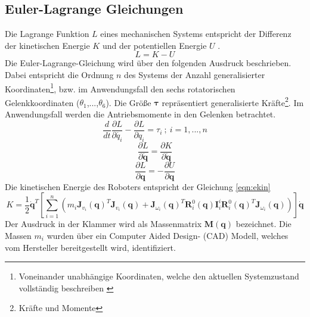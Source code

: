 \subsection{Euler-Lagrange Gleichungen}
Die Lagrange Funktion $L$ eines mechanischen Systems entspricht der Differenz der kinetischen Energie $K$ und der potentiellen Energie $U$ \cite[S.~175]{Spong.2020}. 
\begin{equation}
	L = K-U 
\end{equation}
%
%
%
Die Euler-Lagrange-Gleichung wird über den folgenden Ausdruck beschrieben. Dabei entspricht die Ordnung $n$ des Systems der Anzahl generalisierter Koordinaten\footnote{Voneinander unabhängige Koordinaten, welche den aktuellen Systemzustand vollständig beschreiben \cite{Engelke.2008}}, bzw. im Anwendungsfall den sechs rotatorischen Gelenkkoordinaten ($\theta_1$,...,$\theta_6$). Die Größe $\bm{\tau}$ repräsentiert generalisierte Kräfte\footnote{Kräfte und Momente}. Im Anwendungsfall werden die Antriebsmomente in den Gelenken betrachtet. 
%
\begin{equation}
	\dfrac{d}{dt} \dfrac{\partial{L}}{\partial{\dot{{q}_i}}}- \dfrac{\partial{L}}{\partial{{q}_i}} = {\tau}_i \ ;  \ i = 1,...,n 
\end{equation}
%
\begin{equation}
	\dfrac{\partial{L}}{\partial{\dot{\bm{q}}}} = \dfrac{\partial{K}}{\partial{\dot{\bm{q}}}}
\end{equation}
%
\begin{equation}
	\dfrac{\partial{L}}{\partial{\bm{q}}} = -\dfrac{\partial{U}}{\partial{\bm{q}}}
\end{equation}
%
Die kinetischen Energie des Roboters entspricht der Gleichung  \ref{eqn:ekin}
\begin{equation}
	\label{eqn:ekin}
	K = \dfrac{1}{2} \dot{\bm{\bm{q}}}^T \left[\sum_{i=1}^{n} \left( m_i \bm{J}_{v_i}(\bm{q})^T \bm{J}_{v_i}(\bm{q}) + \bm{J}_{\omega_i}(\bm{q})^T \bm{R}^0_i(\bm{q}) \bm{I}^{i}_{i} \bm{R}^0_i(\bm{q})^T \bm{J}_{\omega_i}(\bm{q}) \right) \right]\dot{\bm{\bm{q}}}
\end{equation}
%
Der Ausdruck in der Klammer wird als Massenmatrix $\bm{M}(\bm{q})$ bezeichnet. 
Die Massen $m_i$ wurden über ein Computer Aided Design- (CAD) Modell, welches vom Hersteller bereitgestellt wird, identifiziert. 
